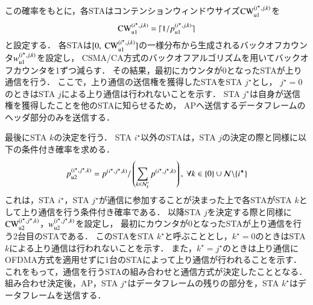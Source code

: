 \documentclass[technicalreport]{ieicej}
\newcommand{\mthnk}{{\mathcal N}'_k}
\begin{document}
			この確率をもとに，各STAはコンテンションウィンドウサイズ${\rm CW}^{(i^{\star},j,k)}_{\rm u1}$を
			\begin{equation}
				{\rm CW}^{(i^{\star},j,k)}_{\rm u1} = \lceil 1/p_{\rm u1}^{(i^{\star},j,k)} \rceil
			\end{equation}
			と設定する．
			各STAは$[0,\ {\rm CW}^{(i^{\star},j,k)}_{\rm u1}]$の一様分布から生成されるバックオフカウンタ$w_{\rm u1}^{(i^{\star},j,k)}$を設定し，
			CSMA/CA方式のバックオフアルゴリズムを用いてバックオフカウンタを1ずつ減らす．
			その結果，最初にカウンタが0となったSTAが上り通信を行う．
			ここで，上り通信の送信権を獲得したSTAをSTA $j^{\star}$とし，
			$j^{\star}=0$のときはSTA $j$による上り通信は行われないことを示す．
			STA $j^{\star}$は自身が送信権を獲得したことを他のSTAに知らせるため，
			APへ送信するデータフレームのヘッダ部分のみを送信する．
			\par
			最後にSTA $k$の決定を行う．
			STA $i^{\star}$以外のSTAは，STA $j$の決定の際と同様に以下の条件付き確率を求める．
			\begin{align}
				p_{\rm u2}^{(i^{\star},j^{\star},k)}=p^{(i^{\star},j^{\star},k)} / \left(\sum_{k\in\mthnk} p^{(i^{\star},j^{\star},k)}\right),\ \forall k \in \{0\}\cup{\mathcal N}\backslash \{i^{\star}\}
			\end{align}
			これは，STA $i^{\star}$，STA $j^{\star}$が通信に参加することが決まった上で各STAがSTA $k$として上り通信を行う条件付き確率である．
			以降STA $j$を決定する際と同様に${\rm CW}^{(i^{\star},j^{\star},k)}_{\rm u2}$，$w_{\rm u2}^{(i^{\star},j^{\star},k)}$を設定し，
			最初にカウンタが0となったSTAが上り通信を行う2台目のSTAである．
			このSTAをSTA $k^{\star}$と呼ぶこととし，$k^{\star}=0$のときはSTA $k$による上り通信は行われないことを示す．
			また，$k^{\star}=j^{\star}$のときは上り通信にOFDMA方式を適用せずに1台のSTAによって上り通信が行われることを示す．
			これをもって，通信を行うSTAの組み合わせと通信方式が決定したこととなる．
			組み合わせ決定後，AP，STA $j^{\star}$はデータフレームの残りの部分を，STA $k^{\star}$はデータフレームを送信する．
\end{document}

